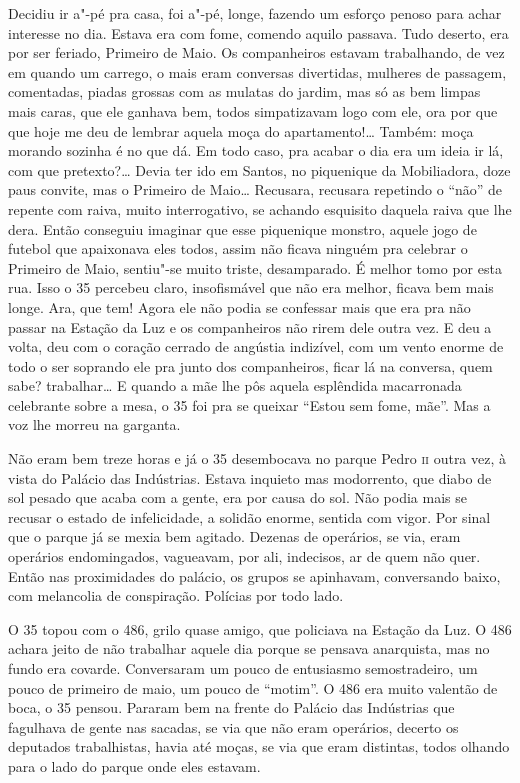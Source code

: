 \begin{linenumbers}
Decidiu ir a"-pé pra casa, foi a"-pé, longe, fazendo um esforço penoso
para achar interesse no dia. Estava era com fome, comendo aquilo
passava. Tudo deserto, era por ser feriado, Primeiro de Maio. Os
companheiros estavam trabalhando, de vez em quando um carrego, o mais
eram conversas divertidas, mulheres de passagem, comentadas, piadas
grossas com as mulatas do jardim, mas só as bem limpas mais caras, que
ele ganhava bem, todos simpatizavam logo com ele, ora por que que hoje
me deu de lembrar aquela moça do apartamento!\ldots{} Também: moça morando
sozinha é no que dá. Em todo caso, pra acabar o dia era um ideia ir lá,
com que pretexto?\ldots{} Devia ter ido em Santos, no piquenique da
Mobiliadora, doze paus convite, mas o Primeiro de Maio\ldots{} Recusara,
recusara repetindo o ``não'' de repente com raiva, muito interrogativo,
se achando esquisito daquela raiva que lhe dera. Então conseguiu
imaginar que esse piquenique monstro, aquele jogo de futebol que
apaixonava eles todos, assim não ficava ninguém pra celebrar o Primeiro
de Maio, sentiu"-se muito triste, desamparado. É melhor tomo por esta
rua. Isso o 35 percebeu claro, insofismável que não era melhor, ficava
bem mais longe. Ara, que tem! Agora ele não podia se confessar mais que
era pra não passar na Estação da Luz e os companheiros não rirem dele
outra vez. E deu a volta, deu com o coração cerrado de angústia
indizível, com um vento enorme de todo o ser soprando ele pra junto dos
companheiros, ficar lá na conversa, quem sabe? trabalhar\ldots{} E quando a
mãe lhe pôs aquela esplêndida macarronada celebrante sobre a mesa, o 35
foi pra se queixar ``Estou sem fome, mãe''. Mas a voz lhe morreu na
garganta.

Não eram bem treze horas e já o 35 desembocava no parque Pedro \textsc{ii} outra
vez, à vista do Palácio das Indústrias. Estava inquieto mas modorrento,
que diabo de sol pesado que acaba com a gente, era por causa do sol. Não
podia mais se recusar o estado de infelicidade, a solidão enorme,
sentida com vigor. Por sinal que o parque já se mexia bem agitado.
Dezenas de operários, se via, eram operários endomingados, vagueavam,
por ali, indecisos, ar de quem não quer. Então nas proximidades do
palácio, os grupos se apinhavam, conversando baixo, com melancolia de
conspiração. Polícias por todo lado.

O 35 topou com o 486, grilo quase amigo, que policiava na Estação da
Luz. O 486 achara jeito de não trabalhar aquele dia porque se pensava
anarquista, mas no fundo era covarde. Conversaram um pouco de entusiasmo
semostradeiro, um pouco de primeiro de maio, um pouco de ``motim''. O
486 era muito valentão de boca, o 35 pensou. Pararam bem na frente do
Palácio das Indústrias que fagulhava de gente nas sacadas, se via que
não eram operários, decerto os deputados trabalhistas, havia até moças,
se via que eram distintas, todos olhando para o lado do parque onde eles
estavam.


\end{linenumbers}
